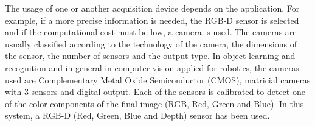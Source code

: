 The usage of one or another acquisition device depends on the application. 
For example,  if a more precise information is needed, the RGB-D sensor is selected and if the computational cost must be low, a camera is used. 
The cameras are usually classified according to the technology of the camera, the dimensions of the sensor, the number of sensors and the output type. 
In object learning and recognition and in general in computer vision applied for robotics, the cameras used are Complementary Metal Oxide Semiconductor (CMOS), matricial cameras with 3 sensors and digital output. 
Each of the sensors is calibrated to detect one of the color components of the final image (RGB, Red, Green and Blue). 
In this system, a RGB-D (Red, Green, Blue and Depth) sensor has been used. 




